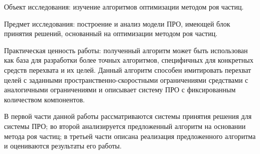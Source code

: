 Объект исследования: изучение алгоритмов оптимизации методом роя частиц.

Предмет исследования: построение и анализ модели ПРО, имеющей блок принятия решений, основанный на оптимизации методом роя частиц.

Практическая ценность работы: полученный алгоритм может быть использован как база для разработки более точных алгоритмов, специфичных для конкретных средств перехвата и их целей. Данный алгоритм способен имитировать перехват целей с заданными пространственно-скоростными ограничениями средствами с аналогичными ограничениями и описывает систему ПРО с фиксированным количеством компонентов. 


В первой части данной работы рассматриваются  системы принятия решения для системы ПРО; во второй анализируется предложенный алгоритм на основании метода роя частиц; в третьей части описана реализация предложенного алгоритма и оцениваются результаты его работы. 


 \newpage %
